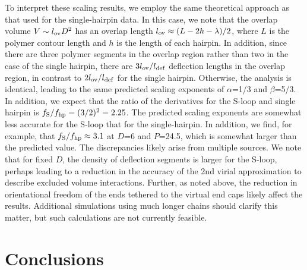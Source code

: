 \documentclass[journal=mamobx,manuscript=article,layout=twocolumn]{achemso}
\begin{document}
To interpret these scaling results, we employ the same theoretical approach as
that used for the single-hairpin data. In this case, we note that the overlap volume
$V\sim l_{\rm ov}D^2$ has an overlap length $l_{\rm ov}\approx (L-2h-\lambda)/2$,
where $L$ is the polymer contour length and $h$ is the length of each hairpin.
In addition, since there are three polymer segments in the overlap region rather
than two in the case of the single hairpin, there are $3l_{\rm ov}/l_{\rm def}$
deflection lengths in the overlap region, in contrast to $2l_{\rm ov}/l_{\rm def}$
for the single hairpin. Otherwise, the analysis is identical, leading to the same
predicted scaling exponents of $\alpha$=1/3 and $\beta$=5/3. In addition, we
expect that the ratio of the derivatives for the S-loop and single hairpin
is $f_{\rm S}/f_{\rm hp}=(3/2)^2=2.25$. The predicted scaling exponents 
are somewhat less accurate for the S-loop that for the single-hairpin. In addition, 
we find, for example, that $f_{\rm S}/f_{\rm hp}\approx 3.1$ at $D$=6 
and $P$=24.5, which is somewhat larger
than the predicted value. The discrepancies likely arise from multiple sources. We note
that for fixed $D$, the density of deflection segments is larger for the S-loop,
perhaps leading to a reduction in the accuracy of the 2nd virial approximation
to describe excluded volume interactions. Further, as noted above, the reduction
in orientational freedom of the ends tethered to the virtual end caps likely affect
the results. Additional simulations using much longer chains should clarify this matter,
but such calculations are not currently feasible. 


\section{Conclusions}
\label{sec:conclusions}
\end{document}
